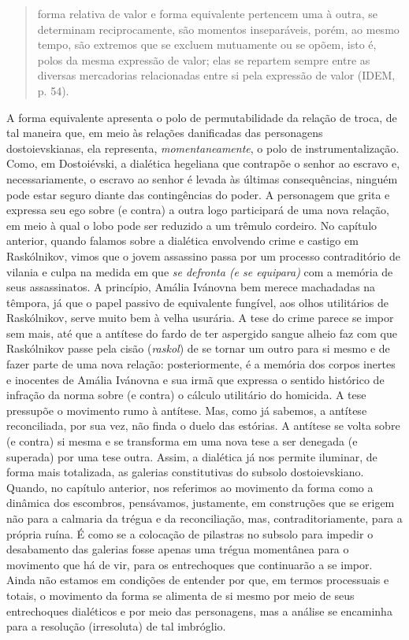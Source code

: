 \begin{quote}
forma relativa de valor e forma equivalente pertencem uma à outra, se
determinam reciprocamente, são momentos inseparáveis, porém, ao mesmo
tempo, são extremos que se excluem mutuamente ou se opõem, isto é, polos
da mesma expressão de valor; elas se repartem sempre entre as diversas
mercadorias relacionadas entre si pela expressão de valor (IDEM, p. 54).
\end{quote}

A forma equivalente apresenta o polo de permutabilidade da relação de
troca, de tal maneira que, em meio às relações danificadas das
personagens dostoievskianas, ela representa, \emph{momentaneamente}, o
polo de instrumentalização. Como, em Dostoiévski, a dialética hegeliana
que contrapõe o senhor ao escravo e, necessariamente, o escravo ao
senhor é levada às últimas consequências, ninguém pode estar seguro
diante das contingências do poder. A personagem que grita e expressa seu
ego sobre (e contra) a outra logo participará de uma nova relação, em
meio à qual o lobo pode ser reduzido a um trêmulo cordeiro. No capítulo
anterior, quando falamos sobre a dialética envolvendo crime e castigo em
Raskólnikov, vimos que o jovem assassino passa por um processo
contraditório de vilania e culpa na medida em que \emph{se defronta (e
se equipara)} com a memória de seus assassinatos. A princípio, Amália
Ivánovna bem merece machadadas na têmpora, já que o papel passivo de
equivalente fungível, aos olhos utilitários de Raskólnikov, serve muito
bem à velha usurária. A tese do crime parece se impor sem mais, até que
a antítese do fardo de ter aspergido sangue alheio faz com que
Raskólnikov passe pela cisão (\emph{raskol}) de se tornar um outro para
si mesmo e de fazer parte de uma nova relação: posteriormente, é a
memória dos corpos inertes e inocentes de Amália Ivánovna e sua irmã que
expressa o sentido histórico de infração da norma sobre (e contra) o
cálculo utilitário do homicida. A tese pressupõe o movimento rumo à
antítese. Mas, como já sabemos, a antítese reconciliada, por sua vez,
não finda o duelo das estórias. A antítese se volta sobre (e contra) si
mesma e se transforma em uma nova tese a ser denegada (e superada) por
uma tese outra. Assim, a dialética já nos permite iluminar, de forma
mais totalizada, as galerias constitutivas do subsolo dostoievskiano.
Quando, no capítulo anterior, nos referimos ao movimento da forma como a
dinâmica dos escombros, pensávamos, justamente, em construções que se
erigem não para a calmaria da trégua e da reconciliação, mas,
contraditoriamente, para a própria ruína. É como se a colocação de
pilastras no subsolo para impedir o desabamento das galerias fosse
apenas uma trégua momentânea para o movimento que há de vir, para os
entrechoques que continuarão a se impor. Ainda não estamos em condições
de entender por que, em termos processuais e totais, o movimento da
forma se alimenta de si mesmo por meio de seus entrechoques dialéticos e
por meio das personagens, mas a análise se encaminha para a resolução
(irresoluta) de tal imbróglio.

